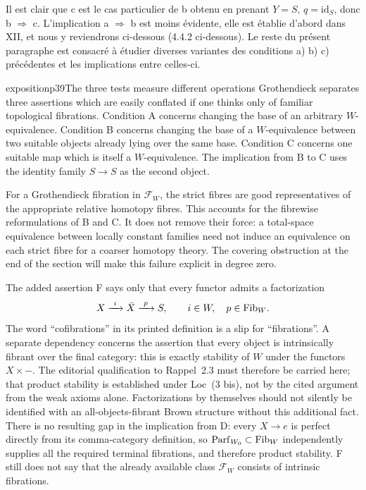 Il est clair que c est le cas particulier de b obtenu en prenant $Y = S$, $q = \mathrm{id}_S$, donc b $\Longrightarrow$ c. L'implication a $\Longrightarrow$ b est moins évidente, elle est établie d'abord dans XII, et nous y reviendrons ci-dessous (4.4.2 ci-dessous). Le reste du présent paragraphe est consacré à étudier diverses variantes des conditions a) b) c) précédentes et les implications entre celles-ci.


\begin{dcomment}{exposition}{p39}{The three tests measure different operations}
Grothendieck separates three assertions which are easily conflated if one thinks only of familiar topological fibrations. Condition A concerns changing the base of an arbitrary $W$-equivalence. Condition B concerns changing the base of a $W$-equivalence between two suitable objects already lying over the same base. Condition C concerns one suitable map which is itself a $W$-equivalence. The implication from B to C uses the identity family $S\to S$ as the second object.

For a Grothendieck fibration in $\mathcal F_W$, the strict fibres are good representatives of the appropriate relative homotopy fibres. This accounts for the fibrewise reformulations of B and C. It does not remove their force: a total-space equivalence between locally constant families need not induce an equivalence on each strict fibre for a coarser homotopy theory. The covering obstruction at the end of the section will make this failure explicit in degree zero.

The added assertion F says only that every functor admits a factorization
\[
 X\xrightarrow{\ i\ }\bar X\xrightarrow{\ p\ }S,
 \qquad i\in W,\quad p\in\mathrm{Fib}_W.
\]
The word ``cofibrations'' in its printed definition is a slip for ``fibrations''. A separate dependency concerns the assertion that every object is intrinsically fibrant over the final category: this is exactly stability of $W$ under the functors $X\times-$. The editorial qualification to Rappel~2.3 must therefore be carried here; that product stability is established under Loc~(3 bis), not by the cited argument from the weak axioms alone. Factorizations by themselves should not silently be identified with an all-objects-fibrant Brown structure without this additional fact. There is no resulting gap in the implication from D: every $X\to e$ is perfect directly from its comma-category definition, so $\mathrm{Parf}_{W_0}\subset\mathrm{Fib}_W$ independently supplies all the required terminal fibrations, and therefore product stability. F still does not say that the already available class $\mathcal F_W$ consists of intrinsic fibrations.


\end{dcomment}
